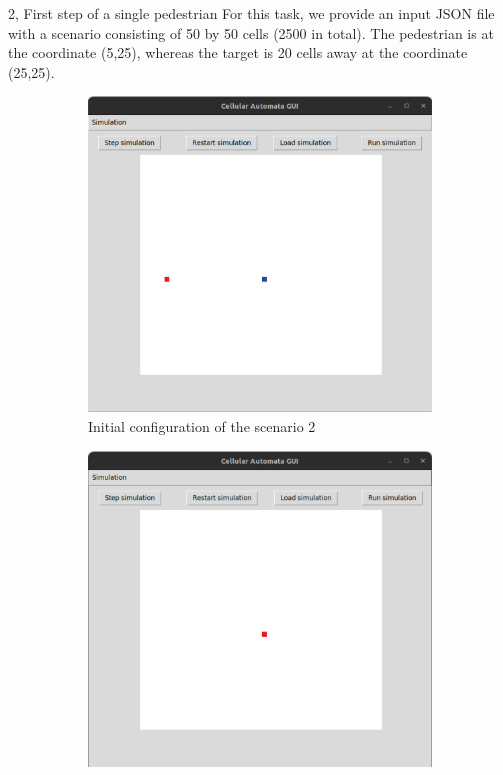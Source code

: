 \documentclass[10pt,a4paper]{article}
\begin{document}
\newpage
\begin{task}{2, First step of a single pedestrian}
For this task, we provide an input JSON file with a scenario consisting of 50 by 50 cells (2500 in total). The pedestrian is at the coordinate (5,25), whereas the target is 20 cells away at the coordinate (25,25). \\

\begin{figure}[H]
 \centering
 \begin{subfigure}[b]{0.4\textwidth}
     \centering
     \includegraphics[width=\textwidth]{images/scenario2_initial.png}
    \caption{Initial configuration of the scenario 2}
    \label{fig:scneario2_initial}
 \end{subfigure}
 \begin{subfigure}[b]{0.4\textwidth}
      \centering
     \includegraphics[width=\textwidth]{images/scenario2_final.png}

\end{subfigure}
\end{figure}
\end{task}
\end{document}
